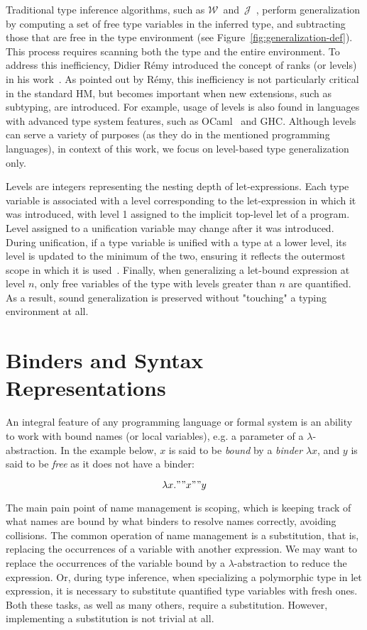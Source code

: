 Traditional type inference algorithms, such as $\mathcal{W}$~and~$\mathcal{J}$~\cite{Milner1978_TypePolymorphism}, perform generalization by computing a set of free type variables in the inferred type, and subtracting those that are free in the type environment (see Figure~\ref{fig:generalization-def}). This process requires scanning both the type and the entire environment. To address this inefficiency, Didier R\'emy introduced the concept of ranks (or levels) in his work~\cite{Remy1992_SortedEqTheoryTypes}. As pointed out by R\'emy, this inefficiency is not particularly critical in the standard HM, but becomes important when new extensions, such as subtyping, are introduced. For example, usage of levels is also found in languages with advanced type system features, such as OCaml~\cite{Kiselyov2022_OCamplTypeChecker} and GHC\cite{Simon2002_SecretsGHC}. Although levels can serve a variety of purposes (as they do in the mentioned programming languages), in context of this work, we focus on level-based type generalization only.

Levels are integers representing the nesting depth of let-expressions. Each type variable is associated with a level corresponding to the let-expression in which it was introduced, with level 1 assigned to the implicit top-level let of a program. Level assigned to a unification variable may change after it was introduced. During unification, if a type variable is unified with a type at a lower level, its level is updated to the minimum of the two, ensuring it reflects the outermost scope in which it is used~\cite{Kiselyov2022_OCamplTypeChecker}. Finally, when generalizing a let-bound expression at level $n$, only free variables of the type with levels greater than $n$ are quantified. As a result, sound generalization is preserved without "touching" a typing environment at all.

\section{Binders and Syntax Representations}

An integral feature of any programming language or formal system is an ability to work with bound names (or local variables), e.g. a parameter of a $\lambda$-abstraction. In the example below, $x$ is said to be \textit{bound} by a \textit{binder} $\lambda x$, and $y$ is said to be \textit{free} as it does not have a binder:

$$
\lambda x." "x" "y
$$

The main pain point of name management is scoping, which is keeping track of what names are bound by what binders to resolve names correctly, avoiding collisions. The common operation of name management is a substitution, that is, replacing the occurrences of a variable with another expression. We may want to replace the occurrences of the variable bound by a $\lambda$-abstraction to reduce the expression. Or, during type inference, when specializing a polymorphic type in let expression, it is necessary to substitute quantified type variables with fresh ones. Both these tasks, as well as many others, require a substitution. However, implementing a substitution is not trivial at all.

